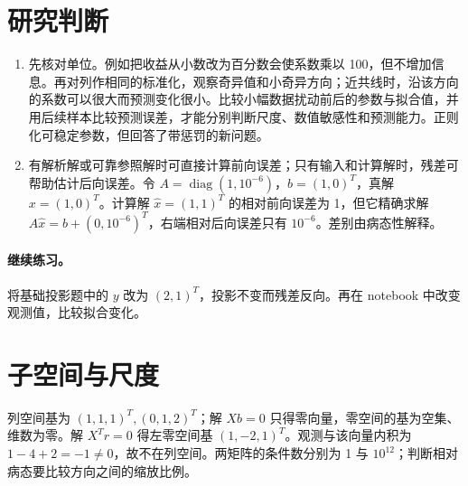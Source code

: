 \section*{研究判断}
\begin{enumerate}[leftmargin=*]
\item 先核对单位。例如把收益从小数改为百分数会使系数乘以 100，但不增加信息。再对列作相同的标准化，观察奇异值和小奇异方向；近共线时，沿该方向的系数可以很大而预测变化很小。比较小幅数据扰动前后的参数与拟合值，并用后续样本比较预测误差，才能分别判断尺度、数值敏感性和预测能力。正则化可稳定参数，但回答了带惩罚的新问题。
\item 有解析解或可靠参照解时可直接计算前向误差；只有输入和计算解时，残差可帮助估计后向误差。令 $A=\operatorname{diag}(1,10^{-6})$，$b=(1,0)^T$，真解 $x=(1,0)^T$。计算解 $\widehat x=(1,1)^T$ 的相对前向误差为 1，但它精确求解 $A\widehat x=b+(0,10^{-6})^T$，右端相对后向误差只有 $10^{-6}$。差别由病态性解释。
\end{enumerate}

\paragraph{继续练习。}将基础投影题中的 $y$ 改为 $(2,1)^T$，投影不变而残差反向。再在 notebook 中改变观测值，比较拟合变化。



\MFQMappedUpperChSixSolutions

\section*{子空间与尺度}
列空间基为 $(1,1,1)^T,(0,1,2)^T$；解 $Xb=0$ 只得零向量，零空间的基为空集、维数为零。解 $X^Tr=0$ 得左零空间基 $(1,-2,1)^T$。观测与该向量内积为 $1-4+2=-1\ne0$，故不在列空间。两矩阵的条件数分别为 1 与 $10^{12}$；判断相对病态要比较方向之间的缩放比例。
